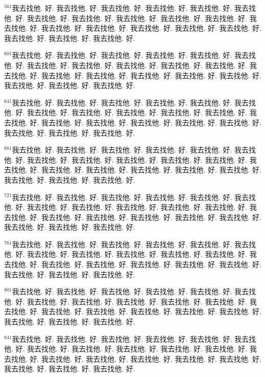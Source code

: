 \documentclass{book}
\begin{document}
$^{561}$我去找他.
好.
我去找他.
好.
我去找他.
好.
我去找他.
好.
我去找他.
好.
我去找他.
好.
我去找他.
好.
我去找他.
好.
我去找他.
好.
我去找他.
好.
我去找他.
好.
我去找他.
好.
我去找他.
好.
我去找他.
好.
我去找他.
好.
我去找他.
好.
我去找他.
好.
我去找他.
好.
我去找他.
好.
我去找他.
好.

$^{601}$我去找他.
好.
我去找他.
好.
我去找他.
好.
我去找他.
好.
我去找他.
好.
我去找他.
好.
我去找他.
好.
我去找他.
好.
我去找他.
好.
我去找他.
好.
我去找他.
好.
我去找他.
好.
我去找他.
好.
我去找他.
好.
我去找他.
好.
我去找他.
好.
我去找他.
好.
我去找他.
好.
我去找他.
好.
我去找他.
好.

$^{641}$我去找他.
好.
我去找他.
好.
我去找他.
好.
我去找他.
好.
我去找他.
好.
我去找他.
好.
我去找他.
好.
我去找他.
好.
我去找他.
好.
我去找他.
好.
我去找他.
好.
我去找他.
好.
我去找他.
好.
我去找他.
好.
我去找他.
好.
我去找他.
好.
我去找他.
好.
我去找他.
好.
我去找他.
好.
我去找他.
好.

$^{681}$我去找他.
好.
我去找他.
好.
我去找他.
好.
我去找他.
好.
我去找他.
好.
我去找他.
好.
我去找他.
好.
我去找他.
好.
我去找他.
好.
我去找他.
好.
我去找他.
好.
我去找他.
好.
我去找他.
好.
我去找他.
好.
我去找他.
好.
我去找他.
好.
我去找他.
好.
我去找他.
好.
我去找他.
好.
我去找他.
好.

$^{721}$我去找他.
好.
我去找他.
好.
我去找他.
好.
我去找他.
好.
我去找他.
好.
我去找他.
好.
我去找他.
好.
我去找他.
好.
我去找他.
好.
我去找他.
好.
我去找他.
好.
我去找他.
好.
我去找他.
好.
我去找他.
好.
我去找他.
好.
我去找他.
好.
我去找他.
好.
我去找他.
好.
我去找他.
好.
我去找他.
好.

$^{761}$我去找他.
好.
我去找他.
好.
我去找他.
好.
我去找他.
好.
我去找他.
好.
我去找他.
好.
我去找他.
好.
我去找他.
好.
我去找他.
好.
我去找他.
好.
我去找他.
好.
我去找他.
好.
我去找他.
好.
我去找他.
好.
我去找他.
好.
我去找他.
好.
我去找他.
好.
我去找他.
好.
我去找他.
好.
我去找他.
好.

$^{801}$我去找他.
好.
我去找他.
好.
我去找他.
好.
我去找他.
好.
我去找他.
好.
我去找他.
好.
我去找他.
好.
我去找他.
好.
我去找他.
好.
我去找他.
好.
我去找他.
好.
我去找他.
好.
我去找他.
好.
我去找他.
好.
我去找他.
好.
我去找他.
好.
我去找他.
好.
我去找他.
好.
我去找他.
好.
我去找他.
好.

$^{841}$我去找他.
好.
我去找他.
好.
我去找他.
好.
我去找他.
好.
我去找他.
好.
我去找他.
好.
我去找他.
好.
我去找他.
好.
我去找他.
好.
我去找他.
好.
我去找他.
好.
我去找他.
好.
我去找他.
好.
我去找他.
好.
我去找他.
好.
我去找他.
好.
我去找他.
好.
我去找他.
好.
我去找他.
好.
我去找他.
好.
\end{document}
